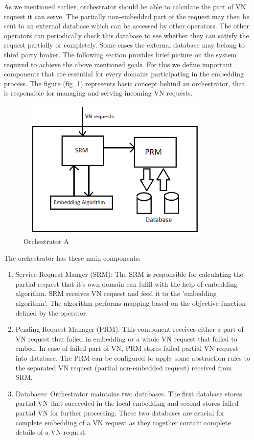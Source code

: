 \documentclass[article,dr=phil,type=msc ,colorback,accentcolor=tud4b]{tudthesis}
\begin{document}
As we mentioned earlier, orchestrator should be able to calculate the part of VN request it can serve. The partially non-embedded part of the request may then be sent to an external database which can be accessed by other operators. The other operators can periodically check this database to see whether they can satisfy the request partially or completely. Some cases the external database may belong to third party broker. The following section provides brief picture on the system required to achieve the above mentioned goals. For this we define important components that are essential for every domains participating in the embedding process. The figure (fig .\ref{orch}) represents basic concept behind an orchestrator, that is responsible for managing and serving incoming VN requests. \newline
\begin{figure}[h]
	\centering
	\includegraphics[width=10cm, height=7cm]{orch}
	\caption{Orchestrator A}
	\label{orch}
\end{figure}

The orchestrator has these main components:

\begin{enumerate}
\item  Service Request Manger (SRM): The SRM is responsible for calculating the partial request that it's own domain can fulfil with the help of embedding algorithm. SRM receives VN request and feed it to the 'embedding algorithm'. The algorithm performs mapping based on the objective function defined by the operator.
	
\item Pending Request Manager (PRM): This component receives either a part of VN request that failed in embedding or a whole VN request that failed to embed. In case of failed part of VN, PRM stores failed partial VN request into database. The PRM can be configured to apply some abstraction rules to the separated VN request (partial non-embedded request) received from SRM. 

\item Databases: Orchestrator maintains two databases. The first database stores partial VN that succeeded in the local embedding and second stores failed partial VN for further processing. These two databases are crucial for complete embedding of a VN request as they together contain complete details of a VN request.	
\end{enumerate}
 
\end{document}
